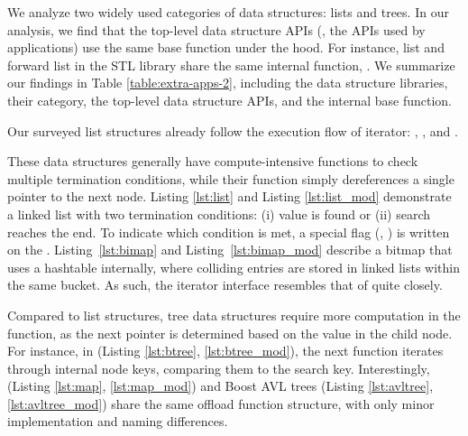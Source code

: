 We analyze two widely used categories of data structures: lists and trees. In our analysis, we find that the top-level data structure APIs (\ie, the APIs used by applications) use the same base function under the hood. For instance, list and forward list in the STL library share the same internal function, . We summarize our findings in Table \ref{table:extra-apps-2}, including the data structure libraries, their category, the top-level data structure APIs, and the internal base function.

 Our surveyed list structures already follow the execution flow of \name iterator: , , and .

These data structures generally have compute-intensive  functions to check multiple termination conditions, while their  function simply dereferences a single pointer to the next node. Listing \ref{lst:list} and Listing \ref{lst:list_mod} demonstrate a linked list with two termination conditions: (i) value is found or (ii) search reaches the end. To indicate which condition is met, a special flag (\eg, ) is written on the . Listing~\ref{lst:bimap} and Listing~\ref{lst:bimap_mod} describe a bitmap that uses a hashtable internally, where colliding entries are stored in linked lists within the same bucket. As such, the \name iterator interface resembles that of  quite closely.

Compared to list structures, tree data structures require more computation in the  function, as the next pointer is determined based on the value in the child node. For instance, in  (Listing \ref{lst:btree}, \ref{lst:btree_mod}), the next function iterates through internal node keys, comparing them to the search key. Interestingly,  (Listing \ref{lst:map}, \ref{lst:map_mod}) and Boost AVL trees (Listing \ref{lst:avltree}, \ref{lst:avltree_mod}) share the same offload function structure, with only minor implementation and naming differences.

